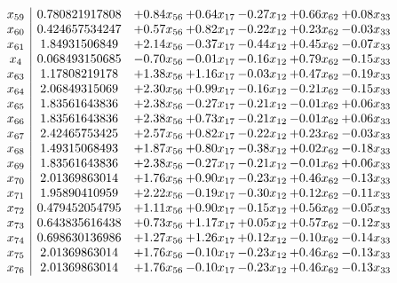 \documentclass[8pt]{article}
\begin{document}
\[\begin{array}{c| c c@{\hskip 2pt} c@{\hskip 2pt} c@{\hskip 2pt} c@{\hskip 2pt} c@{\hskip 2pt} }
 x_{59}   &  0.780821917808 & +  0.84 x_{56} & +  0.64 x_{17} & -0.27 x_{12} & +  0.66 x_{62} & +  0.08 x_{33}\\
 x_{60}   &  0.424657534247 & +  0.57 x_{56} & +  0.82 x_{17} & -0.22 x_{12} & +  0.23 x_{62} & -0.03 x_{33}\\
 x_{61}   &  1.84931506849 & +  2.14 x_{56} & -0.37 x_{17} & -0.44 x_{12} & +  0.45 x_{62} & -0.07 x_{33}\\
 x_{4}   &  0.068493150685 & -0.70 x_{56} & -0.01 x_{17} & -0.16 x_{12} & +  0.79 x_{62} & -0.15 x_{33}\\
 x_{63}   &  1.17808219178 & +  1.38 x_{56} & +  1.16 x_{17} & -0.03 x_{12} & +  0.47 x_{62} & -0.19 x_{33}\\
 x_{64}   &  2.06849315069 & +  2.30 x_{56} & +  0.99 x_{17} & -0.16 x_{12} & -0.21 x_{62} & -0.15 x_{33}\\
 x_{65}   &  1.83561643836 & +  2.38 x_{56} & -0.27 x_{17} & -0.21 x_{12} & -0.01 x_{62} & +  0.06 x_{33}\\
 x_{66}   &  1.83561643836 & +  2.38 x_{56} & +  0.73 x_{17} & -0.21 x_{12} & -0.01 x_{62} & +  0.06 x_{33}\\
 x_{67}   &  2.42465753425 & +  2.57 x_{56} & +  0.82 x_{17} & -0.22 x_{12} & +  0.23 x_{62} & -0.03 x_{33}\\
 x_{68}   &  1.49315068493 & +  1.87 x_{56} & +  0.80 x_{17} & -0.38 x_{12} & +  0.02 x_{62} & -0.18 x_{33}\\
 x_{69}   &  1.83561643836 & +  2.38 x_{56} & -0.27 x_{17} & -0.21 x_{12} & -0.01 x_{62} & +  0.06 x_{33}\\
 x_{70}   &  2.01369863014 & +  1.76 x_{56} & +  0.90 x_{17} & -0.23 x_{12} & +  0.46 x_{62} & -0.13 x_{33}\\
 x_{71}   &  1.95890410959 & +  2.22 x_{56} & -0.19 x_{17} & -0.30 x_{12} & +  0.12 x_{62} & -0.11 x_{33}\\
 x_{72}   &  0.479452054795 & +  1.11 x_{56} & +  0.90 x_{17} & -0.15 x_{12} & +  0.56 x_{62} & -0.05 x_{33}\\
 x_{73}   &  0.643835616438 & +  0.73 x_{56} & +  1.17 x_{17} & +  0.05 x_{12} & +  0.57 x_{62} & -0.12 x_{33}\\
 x_{74}   &  0.698630136986 & +  1.27 x_{56} & +  1.26 x_{17} & +  0.12 x_{12} & -0.10 x_{62} & -0.14 x_{33}\\
 x_{75}   &  2.01369863014 & +  1.76 x_{56} & -0.10 x_{17} & -0.23 x_{12} & +  0.46 x_{62} & -0.13 x_{33}\\
 x_{76}   &  2.01369863014 & +  1.76 x_{56} & -0.10 x_{17} & -0.23 x_{12} & +  0.46 x_{62} & -0.13 x_{33}\\

\end{array}\]
\end{document}
